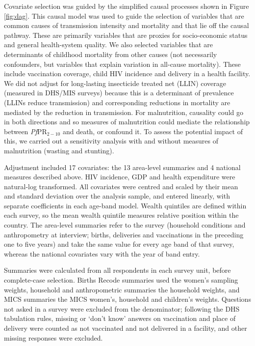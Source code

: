 Covariate selection was guided by the simplified causal processes shown in Figure \ref{fig:dag}. This causal model was used to guide the selection of variables that are common causes of transmission intensity and mortality and that lie off the causal pathway. These are primarily variables that are proxies for socio-economic status and general health-system quality. We also selected variables that are determinants of childhood mortality from other causes (not necessarily confounders, but variables that explain variation in all-cause mortality). These include vaccination coverage, child HIV incidence and delivery in a health facility. We did not adjust for long-lasting insecticide treated net (LLIN) coverage (measured in DHS/MIS surveys) because this is a determinant of prevalence (LLINs reduce transmission) and corresponding reductions in mortality are mediated by the reduction in transmission. For malnutrition, causality could go in both directions and so measures of malnutrition could mediate the relationship between \textit{Pf}PR$_{2-10}$ and death, or confound it. To assess the potential impact of this, we carried out a sensitivity analysis with and without measures of malnutrition (wasting and stunting).

Adjustment included 17 covariates: the 13 area-level summaries and 4 national measures described above. HIV incidence, GDP and health expenditure were natural-log transformed. All covariates were centred and scaled by their mean and standard deviation over the analysis sample, and entered linearly, with separate coefficients in each age-band model. Wealth quintiles are defined within each survey, so the mean wealth quintile measures relative position within the country. The area-level summaries refer to the survey (household conditions and anthropometry at interview; births, deliveries and vaccinations in the preceding one to five years) and take the same value for every age band of that survey, whereas the national covariates vary with the year of band entry.

Summaries were calculated from all respondents in each survey unit, before complete-case selection. Births Recode summaries used the women's sampling weights, household and anthropometric summaries the household weights, and MICS summaries the MICS women's, household and children's weights. Questions not asked in a survey were excluded from the denominator; following the DHS tabulation rules, missing or `don't know' answers on vaccination and place of delivery were counted as not vaccinated and not delivered in a facility, and other missing responses were excluded.

